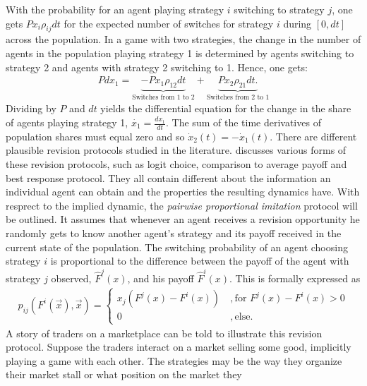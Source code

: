 With the probability for an agent playing strategy $i$ switching to strategy
$j$, one gets $P x_i \rho_{ij} dt$ for the expected number of 
switches for strategy $i$ during $[0,dt]$ across the population.   
In a game with two strategies, the change in the number 
of agents in the population playing strategy 1 is determined 
by agents switching to strategy 2 and agents with strategy 2 
switching to 1. Hence, one gets:
\begin{align} 
        Pdx_1 =  \underbrace{-Px_1 \rho_{12}dt}_{\text{Switches from 1 to 2}} 
        + \underbrace{Px_2 \rho_{21}dt.}_{\text{Switches from 2 to 1}}
\end{align}
Dividing by $P$ and $dt$ yields the differential equation for
the change in the share of agents playing strategy 1, 
$\dot{x_1} =\frac{dx_1}{dt}$. 
The sum of the time derivatives of population shares must equal zero and so
$\dot{x}_2(t) =- \dot{x}_1(t)$.
There are different plausible revision protocols studied in the literature. 
\textcite[128,129,178]{sandholm_population_2010} discusses various forms of 
these revision protocols, such as logit choice, comparison to average payoff 
and best response protocol. 
They all contain different about the information an individual agent 
can obtain and the properties the resulting dynamics have. 
With resprect to the implied dynamic, the 
\textit{pairwise proportional imitation} protocol will be outlined.  
It assumes that whenever an
agent receives a revision opportunity he randomly gets to know 
another agent's strategy and its payoff received in the current 
state of the population. 
The switching probability of an agent choosing strategy $i$  
is proportional to the difference between the payoff of the agent with 
strategy $j$ observed, $\hat{F}^j(x)$, and his
payoff $\hat{F}^i(x)$.
This is formally expressed as
\begin{align}
        \label{eq:pairwiseproportionalimitation}
        p_{ij}(F^i(\vec{x}),\vec{x}) =
                \begin{cases}
                        x_j(F^j(x) -F^i(x)) &\ , \text{for } F^j(x) - F^i(x) > 0 \\
                        0 &\ , \text{else}.
                \end{cases}
\end{align}
A story of traders on a marketplace can be told to illustrate this revision
protocol.
Suppose the traders interact on a market selling some 
good, implicitly playing a game with each other. The strategies may be the
way they organize their market stall or what position on the market they 
